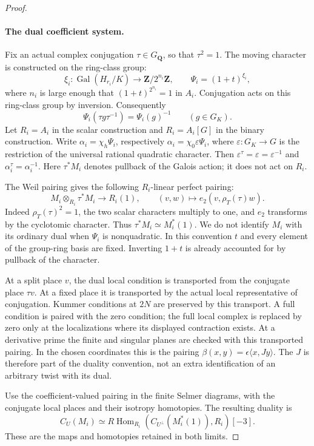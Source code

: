 \documentclass[11pt]{article}
\theoremstyle{definition}
\theoremstyle{remark}
\begin{document}
\begin{proof}\leavevmode
\paragraph{The dual coefficient system.}
Fix an actual complex conjugation $\tau\in G_{\mathbf Q}$, so that
$\tau^2=1$. The moving character is constructed on the ring-class group:
\[
 \xi_i:\operatorname{Gal}(H_{r_i}/K)\longrightarrow
       \mathbf Z/2^{n_i}\mathbf Z,
 \qquad \Psi_i=(1+t)^{\xi_i},
\]
where $n_i$ is large enough that $(1+t)^{2^{n_i}}=1$ in $A_i$.
Conjugation acts on this ring-class group by inversion. Consequently
\[
 \Psi_i(\tau g\tau^{-1})=\Psi_i(g)^{-1}\qquad(g\in G_K).
\]
Let $R_i=A_i$ in the scalar construction and $R_i=A_i[G]$ in the
binary construction. Write $\alpha_i=\chi_h\Psi_i$, respectively
$\alpha_i=\chi_0\varepsilon\Psi_i$, where $\varepsilon:G_K\to G$
is the restriction of the universal rational quadratic character.
Then $\varepsilon^\tau=\varepsilon=\varepsilon^{-1}$ and
$\alpha_i^\tau=\alpha_i^{-1}$. Here $\tau^*M_i$ denotes pullback
of the Galois action; it does not act on $R_i$.

The Weil pairing gives the following $R_i$-linear perfect pairing:
\[
 M_i\otimes_{R_i}\tau^*M_i\longrightarrow R_i(1),\qquad
 (v,w)\longmapsto e_2(v,\rho_T(\tau)w).
\]
Indeed $\rho_T(\tau)^2=1$, the two scalar characters multiply to
one, and $e_2$ transforms by the cyclotomic character. Thus
$\tau^*M_i\simeq M_i^*(1)$. We do not identify $M_i$ with its
ordinary dual when $\Psi_i$ is nonquadratic. In this convention $t$
and every element of the group-ring basis are fixed. Inverting $1+t$
is already accounted for by pullback of the character.

At a split place $v$, the dual local condition is transported from
the conjugate place $\tau v$. At a fixed place it is transported
by the actual local representative of conjugation. Kummer conditions
at $2N$ are preserved by this transport. A full condition is paired
with the zero condition; the full local complex is replaced by zero
only at the localizations where its displayed contraction exists.
At a derivative prime the finite and singular planes are checked
with this transported pairing. In the chosen coordinates this is
the pairing $\beta(x,y)=\epsilon\langle x,Jy\rangle$.
The $J$ is therefore part of the duality convention, not an extra
identification of an arbitrary twist with its dual.

Use the coefficient-valued pairing in the finite Selmer diagrams,
with the conjugate local places and their isotropy homotopies. The
resulting duality is
\[
 C_U(M_i)\simeq
 R\operatorname{Hom}_{R_i}
       (C_{U^\perp}(M_i^*(1)),R_i)[-3].
\]
These are the maps and homotopies retained in both limits.
\end{proof}
\end{document}
